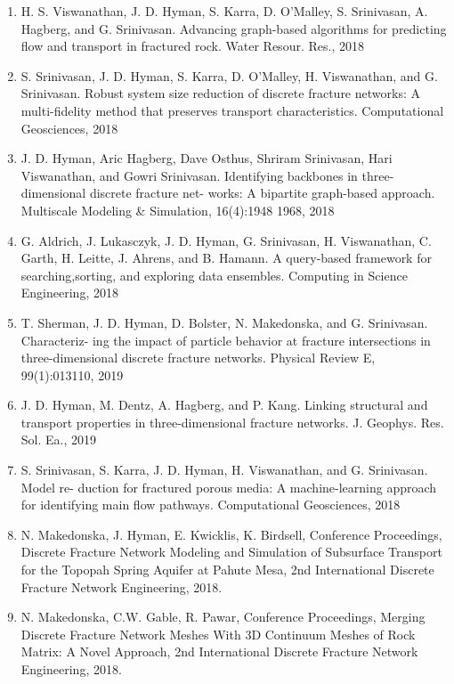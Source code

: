\documentclass[letterpaper,10pt,english]{sphinxmanual}
\begin{document}
\begin{enumerate}
\item {} 
H. S. Viswanathan, J. D. Hyman, S. Karra, D. O’Malley, S. Srinivasan, A. Hagberg, and G. Srinivasan. Advancing graph-based algorithms for predicting flow and transport in fractured rock. Water Resour. Res., 2018

\item {} 
S. Srinivasan, J. D. Hyman, S. Karra, D. O’Malley, H. Viswanathan, and G. Srinivasan. Robust system size reduction of discrete fracture networks: A multi-fidelity method that preserves transport characteristics. Computational Geosciences, 2018

\item {} 
J. D. Hyman, Aric Hagberg, Dave Osthus, Shriram Srinivasan, Hari Viswanathan, and Gowri Srinivasan. Identifying backbones in three-dimensional discrete fracture net- works: A bipartite graph-based approach. Multiscale Modeling \& Simulation, 16(4):1948\textendash{} 1968, 2018

\item {} 
G. Aldrich, J. Lukasczyk, J. D. Hyman, G. Srinivasan, H. Viswanathan, C. Garth, H. Leitte, J. Ahrens, and B. Hamann. A query-based framework for searching,sorting, and exploring data ensembles. Computing in Science Engineering, 2018

\item {} 
T. Sherman, J. D. Hyman, D. Bolster, N. Makedonska, and G. Srinivasan. Characteriz- ing the impact of particle behavior at fracture intersections in three-dimensional discrete fracture networks. Physical Review E, 99(1):013110, 2019

\item {} 
J. D. Hyman, M. Dentz, A. Hagberg, and P. Kang. Linking structural and transport properties in three-dimensional fracture networks. J. Geophys. Res. Sol. Ea., 2019

\item {} 
S. Srinivasan, S. Karra, J. D. Hyman, H. Viswanathan, and G. Srinivasan. Model re- duction for fractured porous media: A machine-learning approach for identifying main flow pathways. Computational Geosciences, 2018

\item {} 
N. Makedonska, J. Hyman, E. Kwicklis, K. Birdsell, Conference Proceedings, Discrete Fracture Network Modeling and Simulation of Subsurface Transport for the Topopah Spring Aquifer at Pahute Mesa, 2nd International Discrete Fracture Network Engineering, 2018.

\item {} 
N. Makedonska, C.W. Gable, R. Pawar, Conference Proceedings, Merging Discrete Fracture Network Meshes With 3D Continuum Meshes of Rock Matrix: A Novel Approach, 2nd International Discrete Fracture Network Engineering, 2018.

\end{enumerate}
\end{document}

